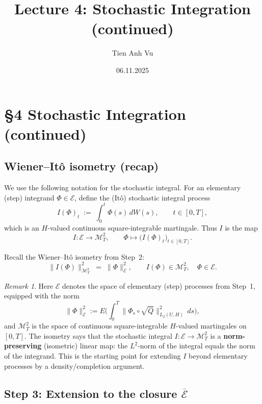 \documentclass[11pt]{article}
\title{Lecture 4: Stochastic Integration (continued)}
\date{06.11.2025}
\author{Tien Anh Vu}
\theoremstyle{definition}
\theoremstyle{remark}
\newtheorem{remark}{Remark}
\begin{document}
\maketitle

\section*{\S 4 Stochastic Integration (continued)}

\subsection*{Wiener--It\^o isometry (recap)}

We use the following notation for the stochastic integral. For an elementary (step) integrand
$\Phi \in \mathcal{E}$, define the (It\^o) stochastic integral process
\[
    I(\Phi)_t
    \;:=\;
    \int_0^t \Phi(s)\,dW(s),
    \qquad t\in[0,T],
\]
which is an $H$-valued continuous square-integrable martingale. Thus $I$ is the map
\[
    I \colon \mathcal{E} \longrightarrow \mathcal{M}_T^2,
    \qquad
    \Phi \longmapsto \bigl(I(\Phi)_t\bigr)_{t\in[0,T]}.
\]

Recall the Wiener--It\^o isometry from Step~2:
\[
    \bigl\|I(\Phi)\bigr\|_{\mathcal{M}_T^2}^2
    \;=\;
    \|\Phi\|_{\mathcal{E}}^2,
    \qquad
    I(\Phi) \in \mathcal{M}_T^2,\quad
    \Phi \in \mathcal{E}.
\]

\begin{remark}
Here $\mathcal{E}$ denotes the space of elementary (step) processes from Step~1, equipped with the norm
\[
    \|\Phi\|_{\mathcal{E}}^2 := E\!\bigl(\int_0^T \|\Phi_s \circ \sqrt{Q}\|_{L_2(U,H)}^2\,ds\bigr),
\]
and $\mathcal{M}_T^2$ is the space of continuous square-integrable $H$-valued martingales on $[0,T]$.
The isometry says that the stochastic integral $I \colon \mathcal{E} \to \mathcal{M}_T^2$ is a \textbf{norm-preserving} (isometric) linear map: the $L^2$-norm of the integral equals the norm of the integrand.
This is the starting point for extending $I$ beyond elementary processes by a density/completion argument.
\end{remark}

\subsection*{Step 3: Extension to the closure $\overline{\mathcal{E}}$}
\end{document}
